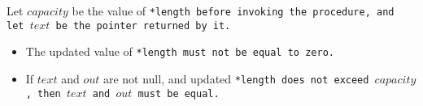 Let $capacity$ be the value of \tt{*length} before invoking the procedure,
and let $text$ be the pointer returned by it.

\begin{itemize}[nosep]

\item The updated value of \tt{*length} must not be equal to zero.

\item If $text$ and $out$ are not null, and updated \tt{*length}
does not exceed $capacity$, then $text$ and $out$ must be equal.

\end{itemize}
